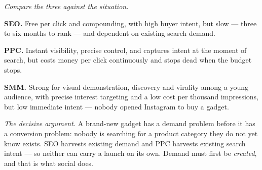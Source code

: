 \begin{qlist}
\textit{Compare the three against the situation.}
\begin{apts}
\item \textbf{SEO.} Free per click and compounding, with high buyer intent, but
      slow --- three to six months to rank --- and dependent on existing search
      demand.
\item \textbf{PPC.} Instant visibility, precise control, and captures intent at
      the moment of search, but costs money per click continuously and stops
      dead when the budget stops.
\item \textbf{SMM.} Strong for visual demonstration, discovery and virality
      among a young audience, with precise interest targeting and a low cost per
      thousand impressions, but low immediate intent --- nobody opened Instagram
      to buy a gadget.
\end{apts}

\textit{The decisive argument.} A brand-new gadget has a demand problem before
it has a conversion problem: nobody is searching for a product category they do
not yet know exists. SEO harvests existing demand and PPC harvests existing
search intent --- so neither can carry a launch on its own. Demand must first be
\emph{created}, and that is what social does.


\end{qlist}
